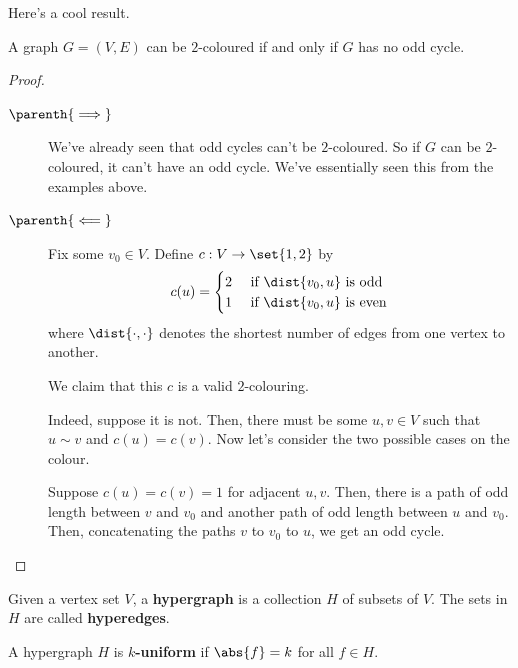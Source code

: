 Here's a cool result.

\begin{boxtheorem}
    A graph $G = (V, E)$ can be $2$-coloured if and only if $G$ has no odd cycle.
\end{boxtheorem}
\begin{proof} \hfill
    \begin{description}
        \item[$\parenth{\implies}$] We've already seen that odd cycles can't be $2$-coloured. So if $G$ can be $2$-coloured, it can't have an odd cycle. We've essentially seen this from the examples above.

        \item[$\parenth{\impliedby}$] Fix some $v_0 \in V$. Define $c : V \to \set{1, 2}$ by
        \begin{align*}
            c(u) =
            \begin{cases}
                2 & \text{ if } \dist{v_0, u} \text{ is odd} \\
                1 & \text{ if } \dist{v_0, u} \text{ is even}
            \end{cases}
        \end{align*}
        where $\dist{\cdot, \cdot}$ denotes the shortest number of edges from one vertex to another.

        We claim that this $c$ is a valid $2$-colouring.

        Indeed, suppose it is not. Then, there must be some $u, v \in V$ such that $u \sim v$ and $c(u) = c(v)$. Now let's consider the two possible cases on the colour.

        Suppose $c(u) = c(v) = 1$ for adjacent $u, v$. Then, there is a path of odd length between $v$ and $v_0$ and another path of odd length between $u$ and $v_0$. Then, concatenating the paths $v$ to $v_0$ to $u$, we get an odd cycle.

    \end{description}
\end{proof}

\begin{boxdefinition}[Hypergraph]
    Given a vertex set $V$, a \textbf{hypergraph} is a collection $H$ of subsets of $V$. The sets in $H$ are called \textbf{hyperedges}.
\end{boxdefinition}

\begin{boxdefinition}[Uniformity]
    A hypergraph $H$ is \textbf{$k$-uniform} if $\abs{f} = k$ for all $f \in H$.
\end{boxdefinition}


